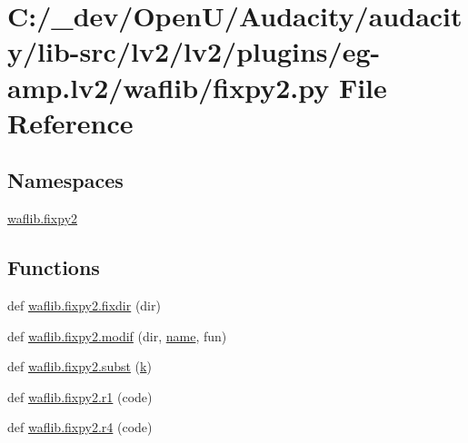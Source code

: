 \hypertarget{lv2_2plugins_2eg-amp_8lv2_2waflib_2fixpy2_8py}{}\section{C\+:/\+\_\+dev/\+Open\+U/\+Audacity/audacity/lib-\/src/lv2/lv2/plugins/eg-\/amp.lv2/waflib/fixpy2.py File Reference}
\label{lv2_2plugins_2eg-amp_8lv2_2waflib_2fixpy2_8py}
\subsection*{Namespaces}
\begin{DoxyCompactItemize}
\item 
 \hyperlink{namespacewaflib_1_1fixpy2}{waflib.\+fixpy2}
\end{DoxyCompactItemize}
\subsection*{Functions}
\begin{DoxyCompactItemize}
\item 
def \hyperlink{namespacewaflib_1_1fixpy2_ab553b609bb1e5be9704eaa0018947909}{waflib.\+fixpy2.\+fixdir} (dir)
\item 
def \hyperlink{namespacewaflib_1_1fixpy2_a4c821ce0a3eff8e4ccbbf9daa9648270}{waflib.\+fixpy2.\+modif} (dir, \hyperlink{lib_2expat_8h_a1b49b495b59f9e73205b69ad1a2965b0}{name}, fun)
\item 
def \hyperlink{namespacewaflib_1_1fixpy2_a5f7f3e2b61180292e779e171dc5a1dbf}{waflib.\+fixpy2.\+subst} (\hyperlink{rfft2d_test_m_l_8m_adc468c70fb574ebd07287b38d0d0676d}{k})
\item 
def \hyperlink{namespacewaflib_1_1fixpy2_a721a8f58a4734bba827b4f6d985f98ff}{waflib.\+fixpy2.\+r1} (code)
\item 
def \hyperlink{namespacewaflib_1_1fixpy2_a3e64c393bc3c2aacf327ab18d56dd7ef}{waflib.\+fixpy2.\+r4} (code)
\end{DoxyCompactItemize}
